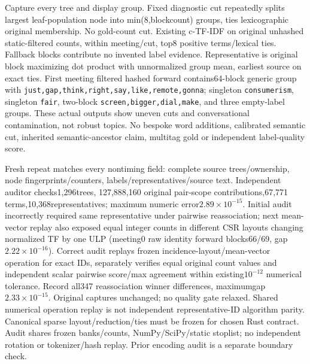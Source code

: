 \documentclass[11pt]{article}
\begin{document}
Capture every tree and display group. Fixed diagnostic cut repeatedly splits
largest leaf-population node into min(8,blockcount) groups, ties lexicographic
original membership. No gold-count cut. Existing c-TF-IDF\cite{bertopic} on
original unhashed static-filtered counts, within meeting/cut, top8 positive
terms/lexical ties. Fallback blocks contribute no invented label evidence.
Representative is original block maximizing dot product with unnormalized group
mean, earliest source on exact ties. First meeting filtered hashed forward
contains64-block generic group with \texttt{just,gap,think,right,say,like,remote,gonna};
singleton \texttt{consumerism}, singleton \texttt{fair}, two-block
\texttt{screen,bigger,dial,make}, and three empty-label groups. These actual
outputs show uneven cuts and conversational contamination, not robust topics.
No bespoke word additions, calibrated semantic cut, inherited semantic-ancestor
claim, multitag gold or independent label-quality score.

Fresh repeat matches every nontiming field: complete source trees/ownership,
node fingerprints/counters, labels/representatives/source text. Independent
auditor  checks1,296trees,
127,888,160 original pair-scope contributions,67,771 terms,10,368representatives;
maximum numeric error$2.89\times10^{-15}$. Initial audit incorrectly required
same representative under pairwise reassociation; next mean-vector replay also
exposed equal integer counts in different CSR layouts changing normalized TF by
one ULP (meeting0 raw identity forward blocks66/69, gap$2.22\times10^{-16}$).
Correct audit replays frozen incidence-layout/mean-vector operation for exact
IDs, separately verifies equal original count values and independent scalar
pairwise score/max agreement within existing$10^{-12}$ numerical tolerance.
Record all347 reassociation winner differences, maximumgap$2.33\times10^{-15}$.
Original captures unchanged; no quality gate relaxed. Shared numerical operation
replay is not independent representative-ID algorithm parity. Canonical sparse
layout/reduction/ties must be frozen for chosen Rust contract. Audit shares
frozen banks/counts, NumPy/SciPy/static stoplist; no independent rotation or
tokenizer/hash replay. Prior encoding audit is a separate boundary check.
\end{document}
